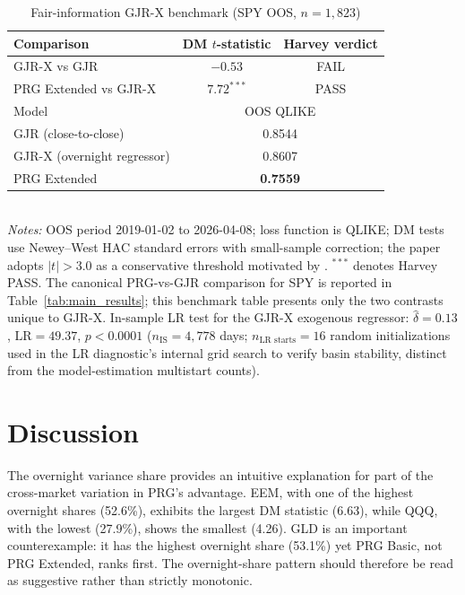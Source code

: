 \documentclass[11pt,a4paper]{article}
\begin{document}
\begin{table}[ht]
\centering
\caption{Fair-information GJR-X benchmark (SPY OOS, $n=1{,}823$)}
\label{tab:gjrx}
\small
\begin{tabular}{lcc}
\toprule
Comparison & DM $t$-statistic & Harvey verdict \\
\midrule
GJR-X vs GJR          & $-0.53$       & FAIL \\
PRG Extended vs GJR-X & $7.72^{***}$  & PASS \\
\midrule
\multicolumn{1}{l}{Model} & \multicolumn{2}{c}{OOS QLIKE} \\
\midrule
GJR (close-to-close)        & \multicolumn{2}{c}{0.8544} \\
GJR-X (overnight regressor) & \multicolumn{2}{c}{0.8607} \\
PRG Extended                & \multicolumn{2}{c}{\textbf{0.7559}} \\
\bottomrule
\end{tabular}
\\[4pt]
\emph{Notes:} OOS period 2019-01-02 to 2026-04-08; loss function is QLIKE; DM tests use Newey--West HAC standard errors with \citet{Harvey1997} small-sample correction; the paper adopts $|t|>3.0$ as a conservative threshold motivated by \citet{Harvey2016}. ${}^{***}$ denotes Harvey PASS. The canonical PRG-vs-GJR comparison for SPY is reported in Table~\ref{tab:main_results}; this benchmark table presents only the two contrasts unique to GJR-X. In-sample LR test for the GJR-X exogenous regressor: $\hat{\delta}=0.13$, $\mathrm{LR}=49.37$, $p<0.0001$ ($n_{\text{IS}}=4{,}778$ days; $n_{\text{LR starts}}=16$ random initializations used in the LR diagnostic's internal grid search to verify basin stability, distinct from the model-estimation multistart counts).
\end{table}


\section{Discussion}

The overnight variance share provides an intuitive explanation for part of the cross-market variation in PRG's advantage. EEM, with one of the highest overnight shares (52.6\%), exhibits the largest DM statistic (6.63), while QQQ, with the lowest (27.9\%), shows the smallest (4.26). GLD is an important counterexample: it has the highest overnight share (53.1\%) yet PRG Basic, not PRG Extended, ranks first. The overnight-share pattern should therefore be read as suggestive rather than strictly monotonic.
\end{document}
